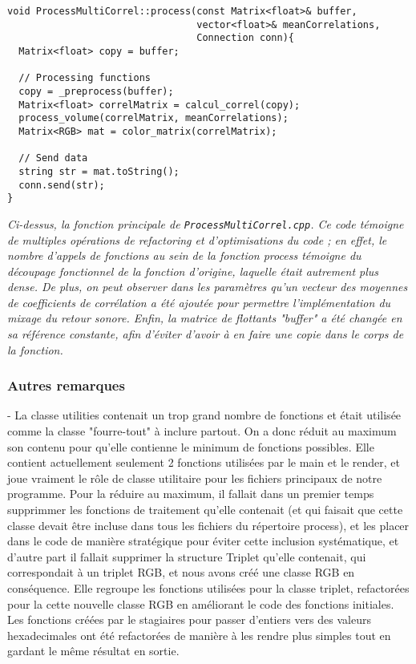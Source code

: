 \begin{lstlisting}
void ProcessMultiCorrel::process(const Matrix<float>& buffer,
                                 vector<float>& meanCorrelations,
                                 Connection conn){
  Matrix<float> copy = buffer;

  // Processing functions
  copy = _preprocess(buffer);
  Matrix<float> correlMatrix = calcul_correl(copy);
  process_volume(correlMatrix, meanCorrelations);
  Matrix<RGB> mat = color_matrix(correlMatrix);

  // Send data
  string str = mat.toString();
  conn.send(str);
}
\end{lstlisting}
\begin{center}
  \textit{Ci-dessus, la fonction principale de
    \verb!ProcessMultiCorrel.cpp!. Ce code témoigne de multiples
    opérations de refactoring et d'optimisations du code ; en effet,
    le nombre d'appels de fonctions au sein de la fonction process témoigne du
    découpage fonctionnel de la fonction d'origine, laquelle était autrement
    plus dense. De plus, on peut observer dans les paramètres qu'un
    vecteur des moyennes de coefficients de corrélation a été ajoutée
    pour permettre l'implémentation du mixage du retour sonore. Enfin,
    la matrice de flottants "buffer" a été changée en sa référence
    constante, afin d'éviter d'avoir à en faire une copie dans le
    corps de la fonction.}
  \end{center}

\subsubsection{Autres remarques}
  - La classe utilities contenait un trop grand nombre de fonctions et était
  utilisée comme la classe "fourre-tout" à inclure partout. On a donc réduit
  au maximum son contenu pour qu'elle contienne le minimum de fonctions
  possibles. Elle contient actuellement seulement 2 fonctions utilisées par le
  main et le render, et joue vraiment le rôle de classe utilitaire pour les
  fichiers principaux de notre programme. Pour la réduire au maximum, il fallait
  dans un premier temps supprimmer les fonctions de traitement qu'elle contenait
  (et qui faisait que cette classe devait être incluse dans tous les fichiers du
  répertoire process), et les placer dans le code de manière stratégique pour
  éviter cette inclusion systématique, et d'autre part il fallait
  supprimer la structure Triplet qu'elle contenait, qui correspondait à un
  triplet RGB, et nous avons créé une classe RGB en conséquence. Elle regroupe
  les fonctions utilisées pour la classe triplet, refactorées pour la cette
  nouvelle classe RGB en améliorant le code des fonctions initiales. Les
  fonctions créées par le stagiaires pour passer d'entiers vers des valeurs
  hexadecimales ont été refactorées de manière à les rendre plus simples tout
  en gardant le même résultat en sortie.

